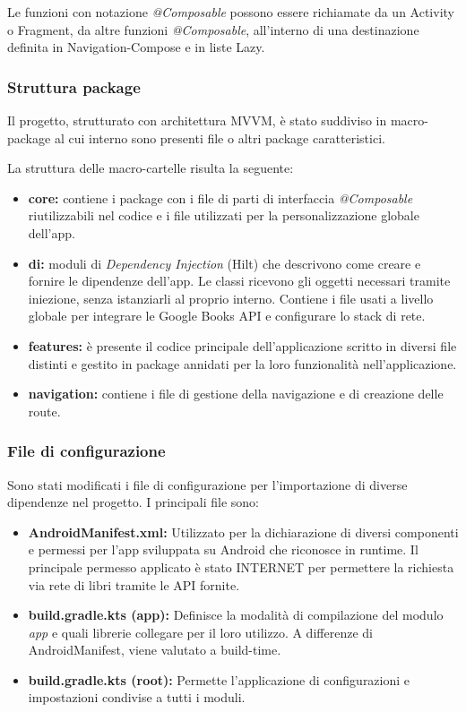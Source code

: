 \documentclass{article}
\begin{document}
Le funzioni con notazione \textit{@Composable} possono essere richiamate da un Activity o Fragment, da altre funzioni \textit{@Composable}, 
all'interno di una destinazione definita in Navigation-Compose e in liste Lazy.

\subsubsection{Struttura package}
Il progetto, strutturato con architettura MVVM, è stato suddiviso in macro-package al cui interno sono presenti file o altri package caratteristici.

La struttura delle macro-cartelle risulta la seguente:

\begin{itemize}
  \item \textbf{core:} contiene i package con i file di parti di interfaccia
  \textit{@Composable} riutilizzabili nel codice e i file utilizzati per la personalizzazione globale dell'app.
  \item \textbf{di:} moduli di \textit{Dependency Injection} (Hilt) che descrivono come creare e fornire le dipendenze dell’app. 
  Le classi ricevono gli oggetti necessari tramite iniezione, senza istanziarli al proprio interno. 
  Contiene i file usati a livello globale per integrare le Google Books API e configurare lo stack di rete.
  \item \textbf{features:} è presente il codice principale dell'applicazione scritto in diversi file distinti e gestito in package annidati per la loro funzionalità nell'applicazione.
  \item \textbf{navigation:} contiene i file di gestione della navigazione e di creazione delle route.
\end{itemize}

\subsubsection{File di configurazione}

Sono stati modificati i file di configurazione per l'importazione di diverse dipendenze nel progetto.
I principali file sono:

\begin{itemize}
  \item \textbf{AndroidManifest.xml:} Utilizzato per la dichiarazione di diversi componenti e permessi per l'app sviluppata su Android che riconosce in runtime.
  Il principale permesso applicato è stato INTERNET per permettere la richiesta via rete di libri tramite le API fornite.
  \item \textbf{build.gradle.kts (app):} Definisce la modalità di compilazione del modulo \textit{app} e quali librerie collegare per il loro utilizzo. A differenze di AndroidManifest, viene valutato a build-time.
  \item \textbf{build.gradle.kts (root):} Permette l'applicazione di configurazioni e impostazioni condivise a tutti i moduli.
\end{itemize}
\end{document}
